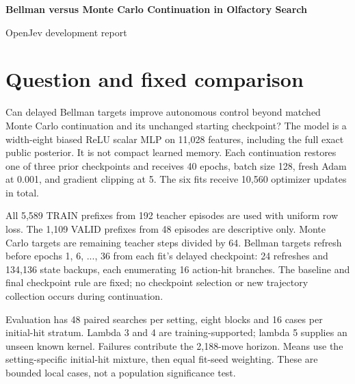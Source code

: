 \documentclass[10pt]{article}
\begin{document}
\begin{center}{\Large\bfseries Bellman versus Monte Carlo Continuation in Olfactory Search\par}
\vspace{3pt}OpenJev development report\end{center}
\begin{abstract}
This paired target-control pilot is FAIL: 19/42 frozen conditions pass (0/18 competence; 19/24 paired improvement). Six continuations use the same MLP architecture and teacher-visited training states. All three fit seeds, three unchanged references, and the analytic controller are retained across 1,440 fresh policy episodes. This tests a learning procedure; it does not establish an architectural or biological-memory advantage.\par
\end{abstract}
\section{Question and fixed comparison}
Can delayed Bellman targets improve autonomous control beyond matched Monte Carlo continuation and its unchanged starting checkpoint? The model is a width-eight biased ReLU scalar MLP on 11,028 features, including the full exact public posterior. It is not compact learned memory. Each continuation restores one of three prior checkpoints and receives 40 epochs, batch size 128, fresh Adam at 0.001, and gradient clipping at 5. The six fits receive 10,560 optimizer updates in total.\par
All 5,589 TRAIN prefixes from 192 teacher episodes are used with uniform row loss. The 1,109 VALID prefixes from 48 episodes are descriptive only. Monte Carlo targets are remaining teacher steps divided by 64. Bellman targets refresh before epochs 1, 6, ..., 36 from each fit's delayed checkpoint: 24 refreshes and 134,136 state backups, each enumerating 16 action-hit branches. The baseline and final checkpoint rule are fixed; no checkpoint selection or new trajectory collection occurs during continuation.\par
Evaluation has 48 paired searches per setting, eight blocks and 16 cases per initial-hit stratum. Lambda 3 and 4 are training-supported; lambda 5 supplies an unseen known kernel. Failures contribute the 2,188-move horizon. Means use the setting-specific initial-hit mixture, then equal fit-seed weighting. These are bounded local cases, not a population significance test.\par
\end{document}
